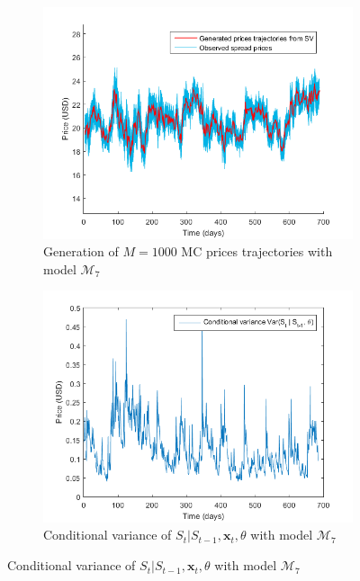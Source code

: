 \documentclass[11pt,a4,twosided,singlespacing,titlepagenumber=on]{scrreprt}
\numberwithin{equation}{chapter} %
\theoremstyle{remark}
\newcommand{\matr}[1]{\mathbf{#1}}
\begin{document}
\begin{figure}[H]
    \centering
    \begin{subfigure}[t]{0.49\textwidth}
        \centering
        \includegraphics[width=1\textwidth]{model_vol/1}
        \caption{Generation of $M = 1000$ MC prices trajectories with model $\mathcal{M}_7$}
        \label{vol_mod_1}
    \end{subfigure}
    \begin{subfigure}[t]{0.49\textwidth}
        \centering
        \includegraphics[width=1\textwidth]{model_vol/2}
        \caption{Conditional variance of $S_t | S_{t-1}, \matr{x}_t, \theta$ with model $\mathcal{M}_7$}
        \label{vol_mod_2}
    \end{subfigure}

\end{figure}
\end{document}
